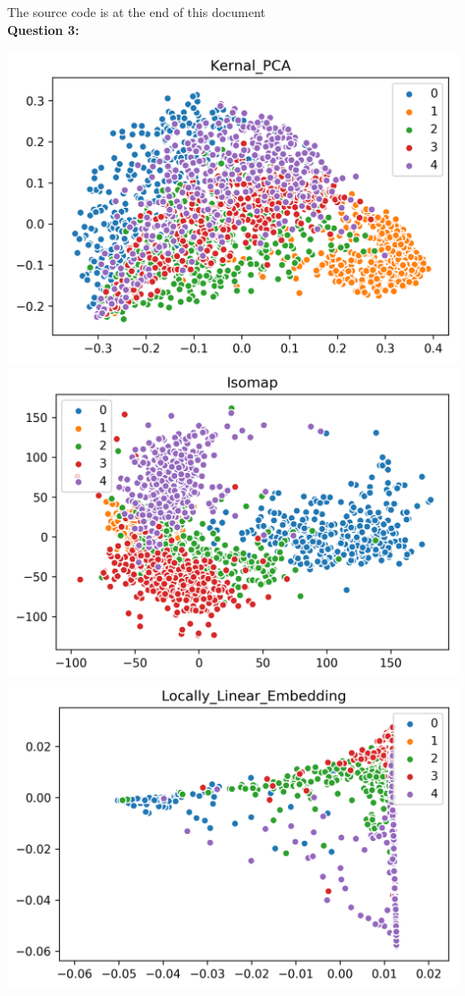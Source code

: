 \documentclass[12pt]{article}
\begin{document}
\noindent
{\LARGE The source code is at the end of this document}\\
\textbf{\large Question 3:}\\
\begin{center}
    \includegraphics[width=14cm]{../plots/Q3_Kernal_PCA.png}
    \includegraphics[width=14cm]{../plots/Q3_Isomap.png}
    \includegraphics[width=15cm]{../plots/Q3_Locally_Linear_Embedding.png}

\end{center}
\end{document}
